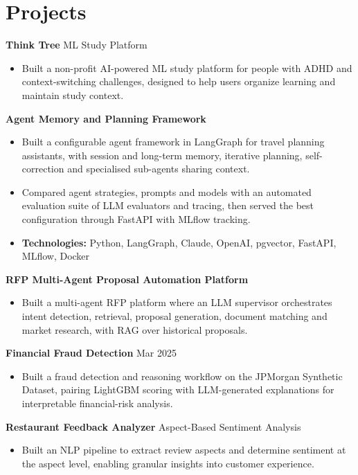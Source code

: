 \documentclass[10pt,a4paper]{article}
\begin{document}
\section{Projects}
\textbf{Think Tree} \textbar{} ML Study Platform\par
\begin{itemize}
  \item Built a non-profit AI-powered ML study platform for people with ADHD and context-switching challenges, designed to help users organize learning and maintain study context.
\end{itemize}
\textbf{Agent Memory and Planning Framework}\par
\begin{itemize}
  \item Built a configurable agent framework in LangGraph for travel planning assistants, with session and long-term memory, iterative planning, self-correction and specialised sub-agents sharing context.
  \item Compared agent strategies, prompts and models with an automated evaluation suite of LLM evaluators and tracing, then served the best configuration through FastAPI with MLflow tracking.
  \item \textbf{Technologies:} Python, LangGraph, Claude, OpenAI, pgvector, FastAPI, MLflow, Docker
\end{itemize}
\textbf{RFP Multi-Agent Proposal Automation Platform}\par
\begin{itemize}
  \item Built a multi-agent RFP platform where an LLM supervisor orchestrates intent detection, retrieval, proposal generation, document matching and market research, with RAG over historical proposals.
\end{itemize}
\textbf{Financial Fraud Detection} \textbar{} Mar 2025\par
\begin{itemize}
  \item Built a fraud detection and reasoning workflow on the JPMorgan Synthetic Dataset, pairing LightGBM scoring with LLM-generated explanations for interpretable financial-risk analysis.
\end{itemize}
\textbf{Restaurant Feedback Analyzer} \textbar{} Aspect-Based Sentiment Analysis\par
\begin{itemize}
  \item Built an NLP pipeline to extract review aspects and determine sentiment at the aspect level, enabling granular insights into customer experience.
\end{itemize}
\end{document}
